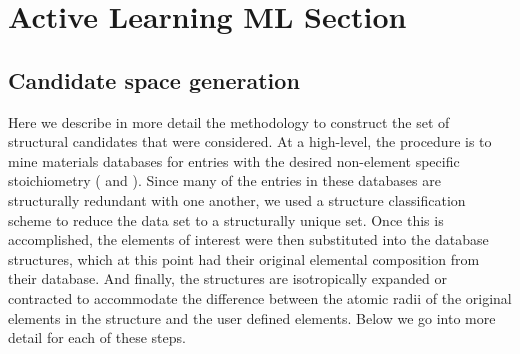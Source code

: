 

\section{Active Learning ML Section}  %
%

\subsection{Candidate space generation}  %
%


%
Here we describe in more detail the methodology to construct the set of structural candidates that were considered.
%
At a high-level, the procedure is to mine materials databases for entries with the desired non-element specific stoichiometry ( \ABtwo and \ABthree).
%
Since many of the entries in these databases are structurally redundant with one another,
we used a structure classification scheme to reduce the data set to a structurally unique set.
%
Once this is accomplished, the elements of interest were then substituted into the database structures, which at this point had their original elemental composition from their database.
%
And finally, the structures are isotropically expanded or contracted to accommodate the difference between the atomic radii of the original elements in the structure and the user defined elements.
%
Below we go into more detail for each of these steps.


